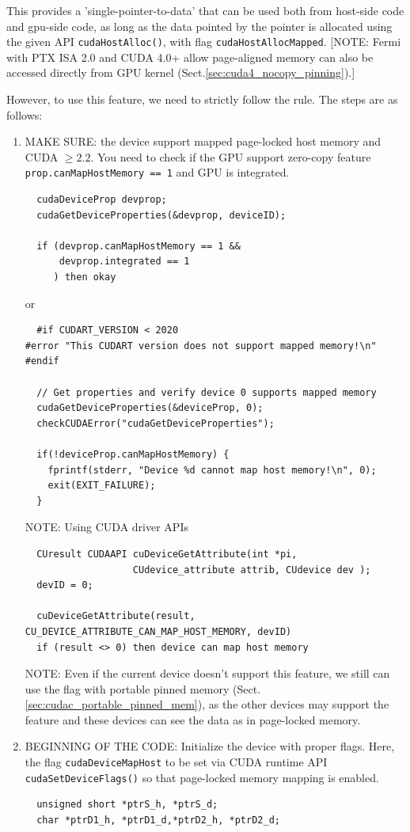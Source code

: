 This provides a 'single-pointer-to-data' that can be used both from host-side
code and gpu-side code, as long as the data pointed by the pointer is allocated
using the given API \verb!cudaHostAlloc()!, with flag
\verb!cudaHostAllocMapped!.
[NOTE: Fermi with PTX ISA 2.0 and CUDA 4.0+ allow page-aligned memory can also
be accessed directly from GPU kernel (Sect.\ref{sec:cuda4_nocopy_pinning}).]

However, to use this feature, we need to strictly follow the rule. The steps are
as follows:
\begin{enumerate}
  
  \item MAKE SURE: the device support mapped page-locked host memory and CUDA
  $\ge 2.2$. You need to check if the GPU support zero-copy feature 
  \verb!prop.canMapHostMemory == 1! and GPU is integrated.
  \begin{lstlisting}
  cudaDeviceProp devprop;
  cudaGetDeviceProperties(&devprop, deviceID);
  
  if (devprop.canMapHostMemory == 1 && 
      devprop.integrated == 1
     ) then okay 
  \end{lstlisting}
  or
  \begin{lstlisting}
  #if CUDART_VERSION < 2020
#error "This CUDART version does not support mapped memory!\n"
#endif

  // Get properties and verify device 0 supports mapped memory
  cudaGetDeviceProperties(&deviceProp, 0);
  checkCUDAError("cudaGetDeviceProperties");

  if(!deviceProp.canMapHostMemory) {
    fprintf(stderr, "Device %d cannot map host memory!\n", 0);
    exit(EXIT_FAILURE);
  }
  \end{lstlisting}
  NOTE: Using CUDA driver APIs
  \begin{lstlisting}
  CUresult CUDAAPI cuDeviceGetAttribute(int *pi,
                   CUdevice_attribute attrib, CUdevice dev );
  devID = 0;
  
  cuDeviceGetAttribute(result, CU_DEVICE_ATTRIBUTE_CAN_MAP_HOST_MEMORY, devID)
  if (result <> 0) then device can map host memory 
  \end{lstlisting}
  NOTE: Even if the current device doesn't support this feature, we still
  can use the flag with portable pinned memory
  (Sect.\ref{sec:cudac_portable_pinned_mem}), as the
  other devices may support the feature and these devices can see the data as
  in page-locked memory.
  
  \item BEGINNING OF THE CODE: Initialize the device with proper flags. Here,
  the flag \verb!cudaDeviceMapHost! to be set via CUDA runtime API
  \verb!cudaSetDeviceFlags()! so that page-locked memory mapping is enabled. 
  \begin{lstlisting}
  unsigned short *ptrS_h, *ptrS_d;
  char *ptrD1_h, *ptrD1_d,*ptrD2_h, *ptrD2_d;
  

\end{lstlisting}
\end{enumerate}
